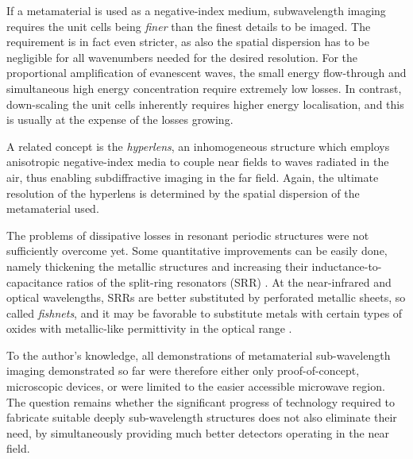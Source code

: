 If a metamaterial is used as a negative-index medium, subwavelength imaging requires the unit cells being \textit{finer} than the finest details to be imaged. The requirement is in fact even stricter, as also the spatial dispersion has to be negligible for all wavenumbers needed for the desired resolution. %
For the proportional amplification of evanescent waves, the small energy flow-through and simultaneous high energy concentration require extremely low losses. In contrast, down-scaling the unit cells inherently requires higher energy localisation, and this is usually at the expense of the losses growing.

A related concept is the \textit{hyperlens}, an inhomogeneous structure which employs anisotropic negative-index media to couple near fields to waves radiated in the air, thus enabling subdiffractive imaging in the far field. Again, the ultimate resolution of the hyperlens is determined by the spatial dispersion of the metamaterial used.

The problems of dissipative losses in resonant periodic structures were not sufficiently overcome yet. Some quantitative improvements can be easily done, namely thickening the metallic structures and increasing their inductance-to-capacitance ratios of the split-ring resonators (SRR) \cite{zhou2008efficient}. At the near-infrared and optical wavelengths, SRRs are better substituted by perforated metallic sheets, so called \textit{fishnets}, %
and it may be favorable to substitute metals with certain types of oxides with metallic-like permittivity in the optical range \cite{naik2011oxides}.

To the author's knowledge, all demonstrations of metamaterial sub-wavelength imaging demonstrated so far were therefore either only proof-of-concept, microscopic devices, or were limited to the easier accessible microwave region. %
The question remains whether the significant progress of technology required to fabricate suitable deeply sub-wavelength structures does not also eliminate their need, by simultaneously providing much better detectors operating in the near field.

